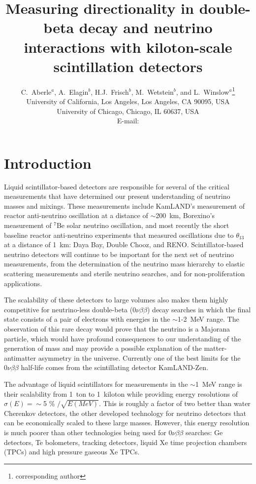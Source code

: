 \documentclass[cits]{JINST}
\title{Measuring directionality in double-beta decay and neutrino interactions with kiloton-scale scintillation detectors}
\author{C.~Aberle$^a$, A.~Elagin$^b$, H.J.~Frisch$^b$, M.~Wetstein$^b$, and L.~Winslow$^a$\setcounter{footnote}{0}\thanks{corresponding author}\\
\llap{$^a$}University of California, Los Angeles, Los Angeles, CA 90095, USA\\
\llap{$^b$}University of Chicago, Chicago, IL 60637, USA\\
  E-mail: \email{lwinslow@physics.ucla.edu}}
\begin{document}
\section{Introduction}
Liquid scintillator-based detectors are responsible for several of the
critical measurements that have determined our present understanding
of neutrino masses and mixings. These measurements include KamLAND's
measurement of reactor anti-neutrino oscillation at a distance of
$\sim$200~km\cite{kam2013}, Borexino's measurement of $^{7}$Be solar
neutrino oscillation\cite{borexino}, and most recently the short
baseline reactor anti-neutrino experiments that measured oscillations
due to $\theta_{13}$ at a distance of 1~km: Daya Bay\cite{dbtwo},
Double Chooz\cite{dctwo, dchydrogen}, and RENO\cite{reno}.
Scintillator-based neutrino detectors will continue to be important for the
next set of neutrino measurements, from the determination of the
neutrino mass hierarchy\cite{juno,reno50} to elastic scattering
measurements\cite{isodarscatt} and sterile neutrino
searches\cite{isodar,nist}, and for non-proliferation
applications\cite{nucifer, songs}.

The scalability of these detectors to large volumes also makes them
highly competitive for neutrino-less double-beta ($0\nu\beta\beta$)
decay searches in which the final state consists of a pair of
electrons with energies in the $\sim$1-2~MeV range.  The observation of this
rare decay would prove that the neutrino is a Majorana particle, which
would have profound consequences to our understanding of the generation of
mass and may provide a possible explanation of the matter-antimatter
asymmetry in the universe\cite{leptogenesis}.  Currently one of the best limits for the
$0\nu\beta\beta$ half-life comes from the scintillating detector
KamLAND-Zen\cite{KZ0nu}.

The advantage of liquid scintillators for measurements in the
$\sim$1~MeV range is their scalability from 1~ton to 1~kiloton while
providing energy resolutions of $\sigma(E)=\sim$5 \% $/\sqrt{E(MeV)}$\cite{kam2013,borexino}. This is roughly a factor of
two better than water Cherenkov detectors, the other developed
technology for neutrino detectors that can be economically scaled to these large
masses. However, this energy resolution is much poorer than other technologies being used for $0\nu\beta\beta$ searches: Ge detectors\cite{gerda2013}, Te bolometers\cite{Alessandria:2011rc}, tracking detectors\cite{SuperNEMO}, liquid Xe time projection chambers (TPCs)\cite{EXO2012} and high pressure gaseous Xe TPCs\cite{NEXTsipm}.  
\end{document}

